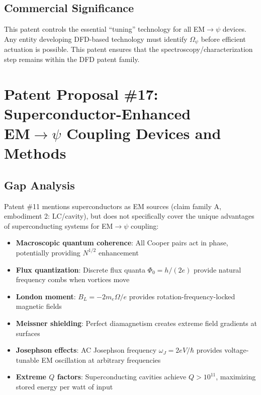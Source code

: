 \documentclass[12pt,letterpaper]{article}
\begin{document}
\subsection{Commercial Significance}

This patent controls the essential ``tuning'' technology for all
EM$\to\psi$ devices. Any entity developing DFD-based technology must
identify $\Omega_\psi$ before efficient actuation is possible. This
patent ensures that the spectroscopy/characterization step remains
within the DFD patent family.

\section{Patent Proposal \#17: Superconductor-Enhanced\\
EM$\to\psi$ Coupling Devices and Methods}

\subsection{Gap Analysis}

Patent \#11 mentions superconductors as EM sources (claim family A,
embodiment 2: LC/cavity), but does not specifically cover the unique
advantages of superconducting systems for EM$\to\psi$ coupling:
\begin{itemize}
\item \textbf{Macroscopic quantum coherence}: All Cooper pairs act
in phase, potentially providing $N^{1/2}$ enhancement
\item \textbf{Flux quantization}: Discrete flux quanta $\Phi_0 = h/(2e)$
provide natural frequency combs when vortices move
\item \textbf{London moment}: $B_L = -2m_e\Omega/e$ provides rotation-frequency-locked
magnetic fields
\item \textbf{Meissner shielding}: Perfect diamagnetism creates extreme
field gradients at surfaces
\item \textbf{Josephson effects}: AC Josephson frequency $\omega_J = 2eV/\hbar$
provides voltage-tunable EM oscillation at arbitrary frequencies
\item \textbf{Extreme $Q$ factors}: Superconducting cavities achieve
$Q > 10^{11}$, maximizing stored energy per watt of input
\end{itemize}
\end{document}
